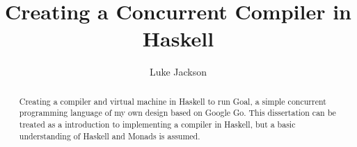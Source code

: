 \documentclass{report}
\author{Luke Jackson}
\title{Creating a Concurrent Compiler in Haskell}
\begin{document}
\maketitle

\begin{abstract}
Creating a compiler and virtual machine in Haskell to run Goal, a simple concurrent programming language of my own design based on Google Go. This dissertation can be treated as a introduction to implementing a compiler in Haskell, but a basic understanding of Haskell and Monads is assumed.
\end{abstract}

\tableofcontents











\end{document}
